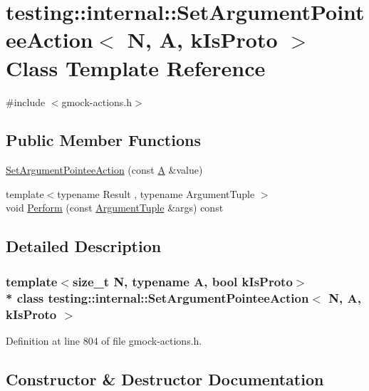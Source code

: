 \hypertarget{classtesting_1_1internal_1_1_set_argument_pointee_action}{}\section{testing\+:\+:internal\+:\+:Set\+Argument\+Pointee\+Action$<$ N, A, k\+Is\+Proto $>$ Class Template Reference}
\label{classtesting_1_1internal_1_1_set_argument_pointee_action}


{\ttfamily \#include $<$gmock-\/actions.\+h$>$}

\subsection*{Public Member Functions}
\begin{DoxyCompactItemize}
\item 
\hyperlink{classtesting_1_1internal_1_1_set_argument_pointee_action_a5a4119ed113667bd4a003ab0bec2cdff}{Set\+Argument\+Pointee\+Action} (const \hyperlink{namespacetesting_a5e9134d655d2fc9323902348083282e7}{A} \&value)
\item 
{\footnotesize template$<$typename Result , typename Argument\+Tuple $>$ }\\void \hyperlink{classtesting_1_1internal_1_1_set_argument_pointee_action_a2bb0bc420cbd3d742853c1a4dab00b15}{Perform} (const \hyperlink{typedefs__d_8js_a396b2bdc7ef45f482a7e9254b15c3c01}{Argument\+Tuple} \&args) const 
\end{DoxyCompactItemize}


\subsection{Detailed Description}
\subsubsection*{template$<$size\+\_\+t N, typename A, bool k\+Is\+Proto$>$\\*
class testing\+::internal\+::\+Set\+Argument\+Pointee\+Action$<$ N, A, k\+Is\+Proto $>$}



Definition at line 804 of file gmock-\/actions.\+h.



\subsection{Constructor \& Destructor Documentation}
